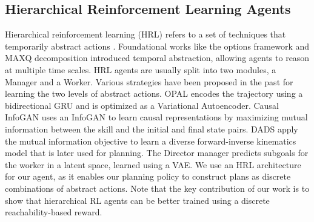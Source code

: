 \subsection{Hierarchical Reinforcement Learning Agents}


Hierarchical reinforcement learning (HRL) refers to a set of techniques that temporarily abstract actions \cite{botvinick2009hierarchically,wiering2012reinforcement,barto2003recent,sutton1999between,pateria2021hierarchical}.
Foundational works like the options framework \cite{sutton1999between} and MAXQ decomposition \cite{dietterich2000hierarchical} introduced temporal abstraction, allowing agents to reason at multiple time scales.
HRL agents are usually split into two modules, a Manager and a Worker.
Various strategies have been proposed in the past for learning the two levels of abstract actions.
OPAL \cite{ajay2020opal} encodes the trajectory using a bidirectional GRU and is optimized as a Variational Autoencoder.
Causal InfoGAN \cite{kurutach2018learning} uses an InfoGAN to learn causal representations by maximizing mutual information between the skill and the initial and final state pairs.
DADS \cite{sharma2020dynamics} apply the mutual information objective to learn a diverse forward-inverse kinematics model that is later used for planning.
The Director \cite{hafner2022deep} manager predicts subgoals for the worker in a latent space, learned using a VAE.
We use an HRL architecture for our agent, as it enables our planning policy to construct plans as discrete combinations of abstract actions.
Note that the key contribution of our work is to show that hierarchical RL agents can be better trained using a discrete reachability-based reward.
